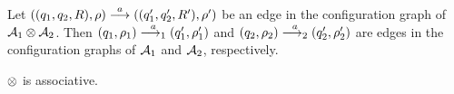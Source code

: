 \begin{proposition}
Let $((q_1,q_2,R),\rho) \overset{a}{\longrightarrow} ((q_1',q_2',R'),\rho')$ be an edge in the configuration graph of $\mathcal{A}_1 \otimes \mathcal{A}_2$. Then $(q_1,\rho_1) \overset{a}{\longrightarrow_{1}} (q_1',\rho_1')$ and $(q_2,\rho_2) \overset{a}{\longrightarrow_{2}} (q_2',\rho_2')$ are edges in the configuration graphs of $\mathcal{A}_1$ and $\mathcal{A}_2$, respectively.
\end{proposition}

\begin{proposition}
$\otimes$ is associative.
\end{proposition}
